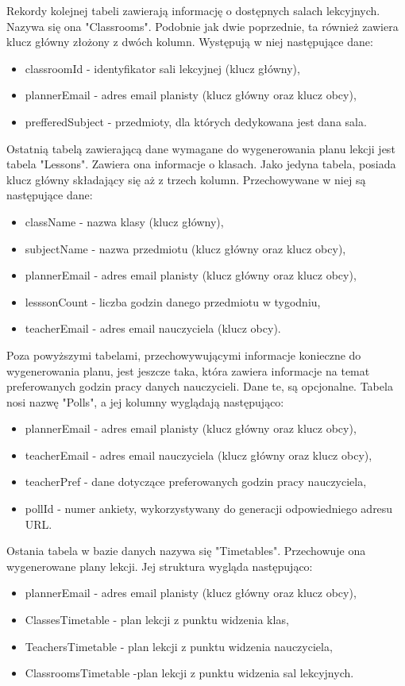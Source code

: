 Rekordy kolejnej tabeli zawierają informację o dostępnych salach lekcyjnych. Nazywa się ona "Classrooms". Podobnie jak dwie poprzednie, ta również zawiera klucz główny złożony z dwóch kolumn. Występują w niej następujące dane:
\begin{itemize}
	\item classroomId - identyfikator sali lekcyjnej (klucz główny),
	\item plannerEmail - adres email planisty (klucz główny oraz klucz obcy),
	\item prefferedSubject - przedmioty, dla których dedykowana jest dana sala.
\end{itemize}

Ostatnią tabelą zawierającą dane wymagane do wygenerowania planu lekcji jest tabela "Lessons". Zawiera ona informacje o klasach. Jako jedyna tabela, posiada klucz główny składający się aż z trzech kolumn. Przechowywane w niej są następujące dane:
\begin{itemize}
	\item className - nazwa klasy (klucz główny),
	\item subjectName - nazwa przedmiotu (klucz główny oraz klucz obcy),
	\item plannerEmail - adres email planisty (klucz główny oraz klucz obcy),
	\item lesssonCount - liczba godzin danego przedmiotu w tygodniu,
	\item teacherEmail - adres email nauczyciela (klucz obcy).
\end{itemize}

Poza powyższymi tabelami, przechowywującymi informacje konieczne do wygenerowania planu, jest jeszcze taka, która zawiera informacje na temat preferowanych godzin pracy danych nauczycieli. Dane te, są opcjonalne. Tabela nosi nazwę "Polls", a jej kolumny wyglądają następująco:
\begin{itemize}
	\item plannerEmail - adres email planisty (klucz główny oraz klucz obcy),
	\item teacherEmail - adres email nauczyciela (klucz główny oraz klucz obcy),
	\item teacherPref -  dane dotyczące preferowanych godzin pracy nauczyciela,
	\item pollId - numer ankiety, wykorzystywany do generacji odpowiedniego adresu URL.
\end{itemize}
 
Ostania tabela w bazie danych nazywa się "Timetables". Przechowuje ona wygenerowane plany lekcji. Jej struktura wygląda następująco:
\begin{itemize}
	\item plannerEmail - adres email planisty (klucz główny oraz klucz obcy),
	\item ClassesTimetable - plan lekcji z punktu widzenia klas,
	\item TeachersTimetable -  plan lekcji z punktu widzenia nauczyciela,
	\item ClassroomsTimetable -plan lekcji z punktu widzenia sal lekcyjnych.
\end{itemize}

